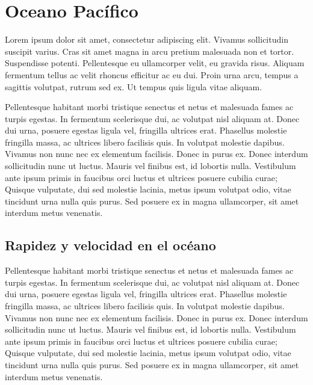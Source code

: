 \documentclass[
]{article}
\begin{document}
\hypertarget{oceano-pacuxedfico}{%
\section{Oceano Pacífico}\label{oceano-pacuxedfico}}

Lorem ipsum dolor sit amet, consectetur adipiscing elit. Vivamus sollicitudin suscipit varius. Cras sit amet magna in arcu pretium malesuada non et tortor. Suspendisse potenti. Pellentesque eu ullamcorper velit, eu gravida risus. Aliquam fermentum tellus ac velit rhoncus efficitur ac eu dui. Proin urna arcu, tempus a sagittis volutpat, rutrum sed ex. Ut tempus quis ligula vitae aliquam.

Pellentesque habitant morbi tristique senectus et netus et malesuada fames ac turpis egestas. In fermentum scelerisque dui, ac volutpat nisl aliquam at. Donec dui urna, posuere egestas ligula vel, fringilla ultrices erat. Phasellus molestie fringilla massa, ac ultrices libero facilisis quis. In volutpat molestie dapibus. Vivamus non nunc nec ex elementum facilisis. Donec in purus ex. Donec interdum sollicitudin nunc ut luctus. Mauris vel finibus est, id lobortis nulla. Vestibulum ante ipsum primis in faucibus orci luctus et ultrices posuere cubilia curae; Quisque vulputate, dui sed molestie lacinia, metus ipsum volutpat odio, vitae tincidunt urna nulla quis purus. Sed posuere ex in magna ullamcorper, sit amet interdum metus venenatis.

\hypertarget{rapidez-y-velocidad-en-el-ocuxe9ano}{%
\subsection{Rapidez y velocidad en el océano}\label{rapidez-y-velocidad-en-el-ocuxe9ano}}

Pellentesque habitant morbi tristique senectus et netus et malesuada fames ac turpis egestas. In fermentum scelerisque dui, ac volutpat nisl aliquam at. Donec dui urna, posuere egestas ligula vel, fringilla ultrices erat. Phasellus molestie fringilla massa, ac ultrices libero facilisis quis. In volutpat molestie dapibus. Vivamus non nunc nec ex elementum facilisis. Donec in purus ex. Donec interdum sollicitudin nunc ut luctus. Mauris vel finibus est, id lobortis nulla. Vestibulum ante ipsum primis in faucibus orci luctus et ultrices posuere cubilia curae; Quisque vulputate, dui sed molestie lacinia, metus ipsum volutpat odio, vitae tincidunt urna nulla quis purus. Sed posuere ex in magna ullamcorper, sit amet interdum metus venenatis.
\end{document}
